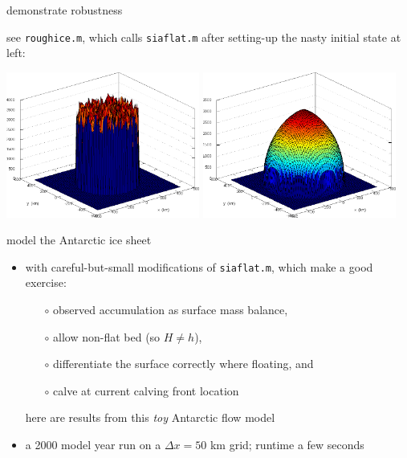 \documentclass[titlepage,letterpaper,final,11pt]{scrartcl}
\begin{document}
demonstrate robustness

see \texttt{roughice.m}, which calls \texttt{siaflat.m} after setting-up the nasty initial state at left:

\includegraphics[width=2.5in]{roughinitial}
\quad
\includegraphics[width=2.5in]{roughfinal}



model the Antarctic ice sheet

\begin{itemize}
\item with careful-but-small modifications of \texttt{siaflat.m}, which make a good exercise:
  \begin{itemize}
  \item[$\circ$] observed accumulation as surface mass balance,
  \item[$\circ$] allow non-flat bed (so $H\ne h$),
  \item[$\circ$] differentiate the surface correctly where floating, and
  \item[$\circ$] calve at current calving front location
  \end{itemize}
here are results from this \emph{toy} Antarctic flow model
\item a 2000 model year run on a $\Delta x=50$ km grid; runtime a few seconds
\end{itemize}
\end{document}
